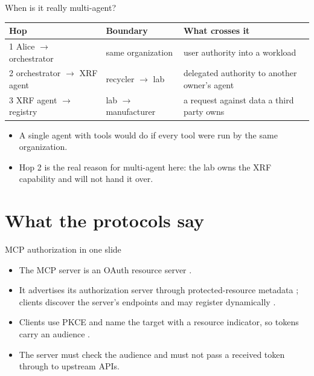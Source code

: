 \documentclass[aspectratio=169, 10pt]{beamer}
\begin{document}
\begin{frame}{When is it really multi-agent?}
  \small
  \begin{tabularx}{\textwidth}{@{}l l X@{}}
    \toprule
    \textbf{Hop} & \textbf{Boundary} & \textbf{What crosses it} \\
    \midrule
    1 Alice $\to$ orchestrator & same organization & user authority into a workload \\
    2 orchestrator $\to$ XRF agent & recycler $\to$ lab & delegated authority to another owner's agent \\
    3 XRF agent $\to$ registry & lab $\to$ manufacturer & a request against data a third party owns \\
    \bottomrule
  \end{tabularx}
  \vspace{3mm}
  \begin{itemize}\small
    \item A single agent with tools would do if every tool were run by the same organization.
    \item Hop 2 is the real reason for multi-agent here: the lab owns the XRF capability and will not hand it over.
  \end{itemize}
\end{frame}

\section{What the protocols say}

\begin{frame}{MCP authorization in one slide}
  \small
  \begin{itemize}
    \item The MCP server is an OAuth resource server .
    \item It advertises its authorization server through protected-resource metadata ; clients discover the server's endpoints  and may register dynamically .
    \item Clients use PKCE  and name the target with a resource indicator, so tokens carry an audience .
    \item The server must check the audience and must not pass a received token through to upstream APIs.
  \end{itemize}
\end{frame}
\end{document}
